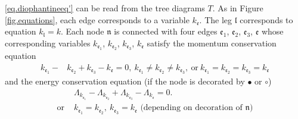 \eqref{eq.diophantineeq'} can be read from the tree diagrams $T$. As in Figure \ref{fig.equations}, each edge corresponds to a variable $k_{\mathfrak{e}}$. The leg $\mathfrak{l}$ corresponds to equation $k_{\mathfrak{l}}=k$. Each node $\mathfrak{n}$ is connected with four edges $\mathfrak{e}_1$, $\mathfrak{e}_2$, $\mathfrak{e}_3$, $\mathfrak{e}$ whose corresponding variables $k_{\mathfrak{e}_1}$, $k_{\mathfrak{e}_2}$, $k_{\mathfrak{e}_3}$, $k_{\mathfrak{e}}$ satisfy the momentum conservation equation
\begin{equation}
\begin{split}
k_{\mathfrak{e}_1}-&k_{\mathfrak{e}_2}+k_{\mathfrak{e}_3}-k_{\mathfrak{e}}=0,\ k_{\mathfrak{e}_1}\ne k_{\mathfrak{e}_2}\ne k_{\mathfrak{e}_3},\ \text{or}\ k_{\mathfrak{e}_1}= k_{\mathfrak{e}_2}= k_{\mathfrak{e}_3}=k_{\mathfrak{e}}
\end{split}
\end{equation}
and the energy conservation equation (if the node is decorated by $\bullet$ or $\circ$)
\begin{equation}
    \begin{split}
        &\Lambda_{k_{\mathfrak{e}_1}}-\Lambda_{k_{\mathfrak{e}_2}}+\Lambda_{k_{\mathfrak{e}_3}}-\Lambda_{k_{\mathfrak{e}}} =0.
        \\
        \text{or } &\text{$k_{\mathfrak{e}_1}=k_{\mathfrak{e}_2},\ k_{\mathfrak{e}_3}=k_{\mathfrak{e}}$ (depending on decoration of $\mathfrak{n}$)}     
    \end{split}
\end{equation}



